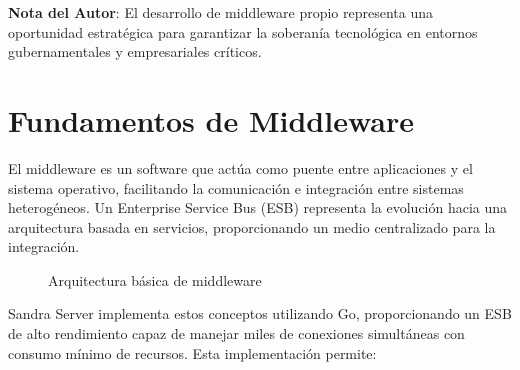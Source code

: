 \documentclass[11pt, spanish, letterpaper, twocolumn]{book}
\begin{document}
\begin{notacientifica}
    \textbf{Nota del Autor}: El desarrollo de middleware propio representa una oportunidad estratégica para garantizar la soberanía tecnológica en entornos gubernamentales y empresariales críticos.
\end{notacientifica}

\section{Fundamentos de Middleware}

El middleware es un software que actúa como puente entre aplicaciones y el sistema operativo, facilitando la comunicación e integración entre sistemas heterogéneos. Un Enterprise Service Bus (ESB) representa la evolución hacia una arquitectura basada en servicios, proporcionando un medio centralizado para la integración.

\begin{figure}
    \centering
    \caption{Arquitectura básica de middleware}
    \label{fig:middleware}
\end{figure}

Sandra Server implementa estos conceptos utilizando Go, proporcionando un ESB de alto rendimiento capaz de manejar miles de conexiones simultáneas con consumo mínimo de recursos. Esta implementación permite:
\end{document}
